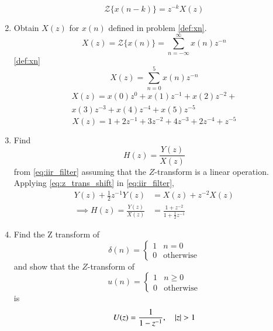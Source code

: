 \documentclass[journal,12pt,twocolumn]{IEEEtran}
\renewcommand\thesection{\arabic{section}}
\begin{document}
\begin{enumerate}[label=\thesection.\arabic*]
\begin{equation}
	\boxed{{\mathcal{Z}}\{x(n-k)\} = z^{-k}X(z)}
\end{equation}
\item Obtain $X(z)$ for $x(n)$ defined in problem 
\ref{def:xn}.
\solution
\begin{equation}
	X(z) = {\mathcal{Z}}\{x(n)\} = \sum_{n=-\infty}^{\infty}x(n)z^{-n}
\end{equation}
\eqref{def:xn}
\begin{equation}
	X(z) = \sum_{n=0}^{5}x(n)z^{-n}
\end{equation}
\begin{align}
	X(z) = x(0)z^{0} + x(1)z^{-1} + x(2)z^{-2} +\\x(3)z^{-3} + x(4)z^{-4} + x(5)z^{-5}
\end{align}
\begin{equation}
	\boxed{X(z) = 1 + 2z^{-1} + 3z^{-2} + 4z^{-3} + 2z^{-4} + z^{-5}}
\end{equation}
\item Find
%
\begin{equation}
	H(z) = \frac{Y(z)}{X(z)}
\end{equation}
%
from  \eqref{eq:iir_filter} assuming that the $Z$-transform is a linear operation.
\\
\solution  Applying \eqref{eq:z_trans_shift} in \eqref{eq:iir_filter},
\begin{align}
	Y(z) + \frac{1}{2}z^{-1}Y(z) &= X(z)+z^{-2}X(z)
	\\
	\implies H(z) = \frac{Y(z)}{X(z)} &= \frac{1 + z^{-2}}{1 + \frac{1}{2}z^{-1}}
	\label{eq:freq_resp}
\end{align}
%
\item Find the Z transform of 
\begin{equation}
	\delta(n)
	=
	\begin{cases}
		1 & n = 0
		\\
		0 & \text{otherwise}
	\end{cases}
\end{equation}
and show that the $Z$-transform of
\begin{equation}
	\label{eq:unit_step}
	u(n)
	=
	\begin{cases}
		1 & n \ge 0
		\\
		0 & \text{otherwise}
	\end{cases}
\end{equation}
is
\begin{equation}
	U(z) = \frac{1}{1-z^{-1}}, \quad \left\vert z\right\vert > 1
\end{equation}

\end{enumerate}
\end{document}
